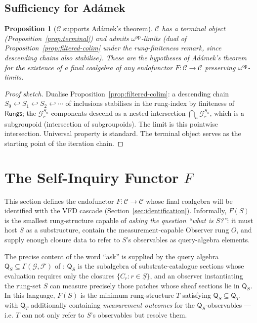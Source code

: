 \documentclass[11pt, a4paper]{amsart}
\newtheorem{proposition}[theorem]{Proposition}
\theoremstyle{definition}
\newcommand{\Rungs}{\mathsf{Rungs}}
\newcommand{\catC}{\mathcal{C}}
\newcommand{\Fcal}{\mathcal{F}}
\newcommand{\Gcal}{\mathcal{G}}
\newcommand{\Qalg}{\mathsf{Q}}
\begin{document}
\subsection{Sufficiency for Ad\'amek}

\begin{proposition}[$\catC$ supports Ad\'amek's theorem]
\label{prop:adamek-sufficient}
$\catC$ has a terminal object (Proposition~\ref{prop:terminal})
and admits $\omega^{\mathrm{op}}$-limits (dual of
Proposition~\ref{prop:filtered-colim} under the rung-finiteness
remark, since descending chains also stabilise). These are the
hypotheses of Ad\'amek's theorem
\cite[Thm.~2.1]{Adamek1974, Rutten2000} for the existence of
a final coalgebra of any endofunctor $F \colon \catC \to
\catC$ preserving $\omega^{\mathrm{op}}$-limits.
\end{proposition}

\begin{proof}[Proof sketch]
Dualise Proposition~\ref{prop:filtered-colim}: a descending
chain $S_0 \hookleftarrow S_1 \hookleftarrow S_2 \hookleftarrow
\cdots$ of inclusions stabilises in the rung-index by finiteness
of $\Rungs$; the $\Gcal_r^{S_n}$ components descend as a nested
intersection $\bigcap_n \Gcal_r^{S_n}$, which is a subgroupoid
(intersection of subgroupoids). The limit is this pointwise
intersection. Universal property is standard. The terminal
object serves as the starting point of the iteration chain.
\end{proof}

\section{The Self-Inquiry Functor $F$}
\label{sec:F}

This section defines the endofunctor $F : \catC \to \catC$ whose
final coalgebra will be identified with the VFD cascade
(Section~\ref{sec:identification}). Informally, $F(S)$ is the
smallest rung-structure capable of \emph{asking the question
``what is $S$?''}: it must host $S$ as a substructure, contain the
measurement-capable Observer rung $O$, and supply enough closure
data to refer to $S$'s observables as query-algebra elements.

The precise content of the word ``ask'' is supplied by the query
algebra $\Qalg_S \subseteq \Gamma(\Gcal, \Fcal)$ of
\cite[\S\S2--3]{CascadeObserverQueryAlgebra}: $\Qalg_S$ is the
subalgebra of substrate-catalogue sections whose evaluation
requires only the closures $\{C_r : r \in \underline{S}\}$, and
an observer instantiating the rung-set $S$ can measure precisely
those patches whose sheaf sections lie in $\Qalg_S$. In this
language, $F(S)$ is the minimum rung-structure $T$ satisfying
$\Qalg_S \subseteq \Qalg_T$ with $\Qalg_T$ additionally containing
\emph{measurement outcomes} for the $\Qalg_S$-observables — i.e.
$T$ can not only refer to $S$'s observables but resolve them.
\end{document}
